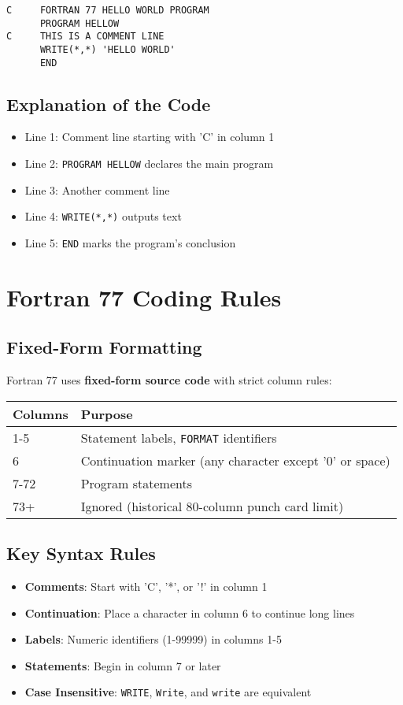 \documentclass{book}
\begin{document}
\begin{verbatim}
C     FORTRAN 77 HELLO WORLD PROGRAM
      PROGRAM HELLOW
C     THIS IS A COMMENT LINE
      WRITE(*,*) 'HELLO WORLD'
      END
\end{verbatim}

\subsection*{Explanation of the Code}
\begin{itemize}
    \item Line 1: Comment line starting with 'C' in column 1
    \item Line 2: \texttt{PROGRAM HELLOW} declares the main program
    \item Line 3: Another comment line
    \item Line 4: \texttt{WRITE(*,*)} outputs text 
    \item Line 5: \texttt{END} marks the program's conclusion
\end{itemize}

\section*{Fortran 77 Coding Rules}

\subsection*{Fixed-Form Formatting}
Fortran 77 uses \textbf{fixed-form source code} with strict column rules:
\begin{center}
\begin{tabular}{|l|l|}
\hline
\textbf{Columns} & \textbf{Purpose} \\ 
\hline
1-5 & Statement labels, \texttt{FORMAT} identifiers \\
6   & Continuation marker (any character except '0' or space) \\
7-72 & Program statements \\
73+ & Ignored (historical 80-column punch card limit) \\
\hline
\end{tabular}
\end{center}

\subsection*{Key Syntax Rules}
\begin{itemize}
    \item \textbf{Comments}: Start with 'C', '*', or '!' in column 1
    \item \textbf{Continuation}: Place a character in column 6 to continue long lines
    \item \textbf{Labels}: Numeric identifiers (1-99999) in columns 1-5
    \item \textbf{Statements}: Begin in column 7 or later
    \item \textbf{Case Insensitive}: \texttt{WRITE}, \texttt{Write}, and \texttt{write} are equivalent
\end{itemize}
\end{document}
